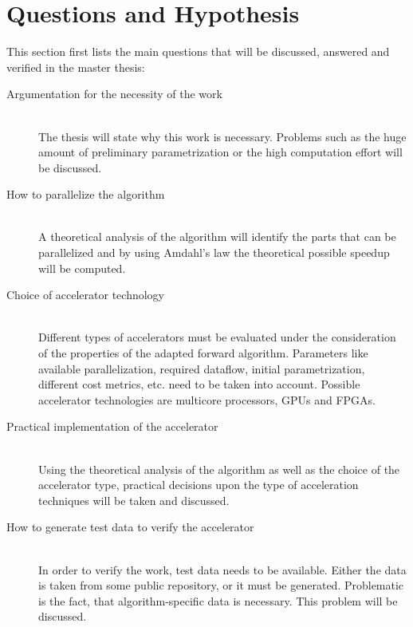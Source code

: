 \documentclass[12pt]{article} %
\begin{document}
\section{Questions and Hypothesis} %

This section first lists the main questions that will be discussed, answered and
verified in the master thesis:
\begin{description}
    \item[Argumentation for the necessity of the work] \hfill \\
        The thesis will state why this work is necessary. Problems such as the
        huge amount of preliminary parametrization or the high computation
        effort will be discussed.
    \item[How to parallelize the algorithm] \hfill \\
        A theoretical analysis of the algorithm will identify the parts that can
        be parallelized and by using Amdahl's law the theoretical possible
        speedup will be computed.
    \item[Choice of accelerator technology] \hfill \\
        Different types of accelerators must be evaluated under the
        consideration of the properties of the adapted forward algorithm.
        Parameters like available parallelization, required dataflow, initial
        parametrization, different cost metrics, etc. need to be taken into
        account. Possible accelerator technologies are multicore processors,
        GPUs and FPGAs.
    \item[Practical implementation of the accelerator] \hfill \\
        Using the theoretical analysis of the algorithm as well as the choice
        of the accelerator type, practical decisions upon the type of
        acceleration techniques will be taken and discussed.
    \item[How to generate test data to verify the accelerator] \hfill \\
        In order to verify the work, test data needs to be available. Either the
        data is taken from some public repository, or it must be generated.
        Problematic is the fact, that algorithm-specific data is necessary. This
        problem will be discussed.
\end{description}
\end{document}
